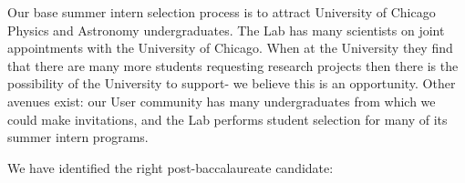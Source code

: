 Our base summer intern selection process is to attract
University of Chicago Physics and Astronomy undergraduates.
The Lab has many scientists on joint appointments with
the University of Chicago. When at the University they find
that there are  many more students
requesting research projects then there is the possibility of
the University to support- we believe this is an opportunity.
Other avenues exist: our User community has many undergraduates
from which we could make invitations, 
and the Lab performs student selection for many of its summer
intern programs.

We have identified the right post-baccalaureate candidate:




